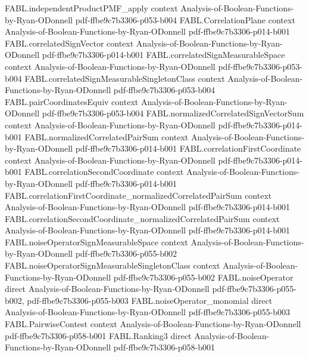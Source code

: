 \begin{theorem}
  {FABL.independentProductPMF_apply}
  {context}
  {Analysis-of-Boolean-Functions-by-Ryan-ODonnell}
  {pdf-ffbe9c7b3306-p053-b004}
\proofstep
  {FABL.CorrelationPlane}
  {context}
  {Analysis-of-Boolean-Functions-by-Ryan-ODonnell}
  {pdf-ffbe9c7b3306-p014-b001}
\proofstep
  {FABL.correlatedSignVector}
  {context}
  {Analysis-of-Boolean-Functions-by-Ryan-ODonnell}
  {pdf-ffbe9c7b3306-p014-b001}
\proofstep
  {FABL.correlatedSignMeasurableSpace}
  {context}
  {Analysis-of-Boolean-Functions-by-Ryan-ODonnell}
  {pdf-ffbe9c7b3306-p053-b004}
\proofstep
  {FABL.correlatedSignMeasurableSingletonClass}
  {context}
  {Analysis-of-Boolean-Functions-by-Ryan-ODonnell}
  {pdf-ffbe9c7b3306-p053-b004}
\proofstep
  {FABL.pairCoordinatesEquiv}
  {context}
  {Analysis-of-Boolean-Functions-by-Ryan-ODonnell}
  {pdf-ffbe9c7b3306-p053-b004}
\proofstep
  {FABL.normalizedCorrelatedSignVectorSum}
  {context}
  {Analysis-of-Boolean-Functions-by-Ryan-ODonnell}
  {pdf-ffbe9c7b3306-p014-b001}
\proofstep
  {FABL.normalizedCorrelatedPairSum}
  {context}
  {Analysis-of-Boolean-Functions-by-Ryan-ODonnell}
  {pdf-ffbe9c7b3306-p014-b001}
\proofstep
  {FABL.correlationFirstCoordinate}
  {context}
  {Analysis-of-Boolean-Functions-by-Ryan-ODonnell}
  {pdf-ffbe9c7b3306-p014-b001}
\proofstep
  {FABL.correlationSecondCoordinate}
  {context}
  {Analysis-of-Boolean-Functions-by-Ryan-ODonnell}
  {pdf-ffbe9c7b3306-p014-b001}
\proofstep
  {FABL.correlationFirstCoordinate_normalizedCorrelatedPairSum}
  {context}
  {Analysis-of-Boolean-Functions-by-Ryan-ODonnell}
  {pdf-ffbe9c7b3306-p014-b001}
\proofstep
  {FABL.correlationSecondCoordinate_normalizedCorrelatedPairSum}
  {context}
  {Analysis-of-Boolean-Functions-by-Ryan-ODonnell}
  {pdf-ffbe9c7b3306-p014-b001}
\proofstep
  {FABL.noiseOperatorSignMeasurableSpace}
  {context}
  {Analysis-of-Boolean-Functions-by-Ryan-ODonnell}
  {pdf-ffbe9c7b3306-p055-b002}
\proofstep
  {FABL.noiseOperatorSignMeasurableSingletonClass}
  {context}
  {Analysis-of-Boolean-Functions-by-Ryan-ODonnell}
  {pdf-ffbe9c7b3306-p055-b002}
\proofstep
  {FABL.noiseOperator}
  {direct}
  {Analysis-of-Boolean-Functions-by-Ryan-ODonnell}
  {pdf-ffbe9c7b3306-p055-b002,
    pdf-ffbe9c7b3306-p055-b003}
\proofstep
  {FABL.noiseOperator_monomial}
  {direct}
  {Analysis-of-Boolean-Functions-by-Ryan-ODonnell}
  {pdf-ffbe9c7b3306-p055-b003}
\proofstep
  {FABL.PairwiseContest}
  {context}
  {Analysis-of-Boolean-Functions-by-Ryan-ODonnell}
  {pdf-ffbe9c7b3306-p058-b001}
\proofstep
  {FABL.Ranking3}
  {direct}
  {Analysis-of-Boolean-Functions-by-Ryan-ODonnell}
  {pdf-ffbe9c7b3306-p058-b001}
\proofstep

\end{theorem}
